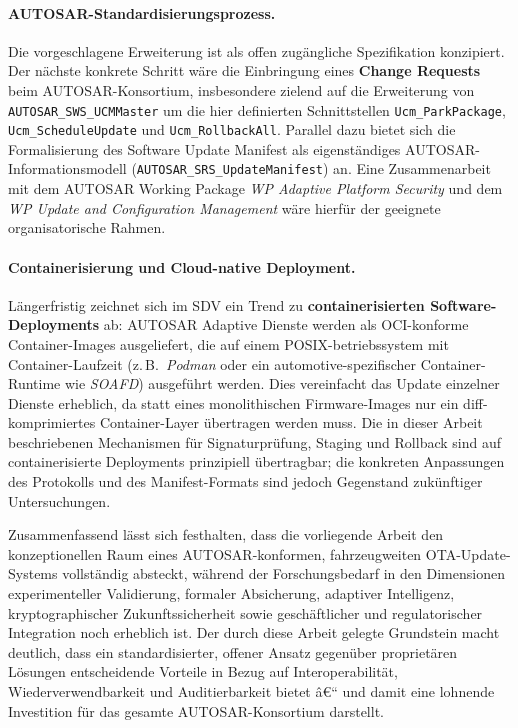 ﻿\documentclass[12pt,a4paper,twoside]{article}
\begin{document}
\paragraph{AUTOSAR-Standardisierungsprozess.}
Die vorgeschlagene Erweiterung ist als offen zugängliche
Spezifikation konzipiert. Der nächste konkrete Schritt wäre
die Einbringung eines \textbf{Change Requests} beim
AUTOSAR-Konsortium, insbesondere zielend auf
die Erweiterung von \texttt{AUTOSAR\_SWS\_UCMMaster} um die hier
definierten Schnittstellen \texttt{Ucm\_ParkPackage},
\texttt{Ucm\_ScheduleUpdate} und \texttt{Ucm\_RollbackAll}.
Parallel dazu bietet sich die Formalisierung des
Software Update Manifest als eigenständiges
AUTOSAR-Informationsmodell (\texttt{AUTOSAR\_SRS\_UpdateManifest})
an. Eine Zusammenarbeit mit dem AUTOSAR Working Package
\textit{WP Adaptive Platform Security} und dem
\textit{WP Update and Configuration Management} wäre hierfür
der geeignete organisatorische Rahmen.

\paragraph{Containerisierung und Cloud-native Deployment.}
Längerfristig zeichnet sich im SDV ein Trend zu
\textbf{containerisierten Software-Deployments} ab: AUTOSAR Adaptive
Dienste werden als OCI-konforme Container-Images ausgeliefert,
die auf einem POSIX-betriebssystem mit Container-Laufzeit
(z.\,B.\ \textit{Podman} oder ein automotive-spezifischer
Container-Runtime wie \textit{SOAFD}) ausgeführt werden.
Dies vereinfacht das Update einzelner Dienste erheblich,
da statt eines monolithischen Firmware-Images nur ein
diff-komprimiertes Container-Layer übertragen werden muss.
Die in dieser Arbeit beschriebenen Mechanismen für
Signaturprüfung, Staging und Rollback sind auf containerisierte
Deployments prinzipiell übertragbar; die konkreten
Anpassungen des Protokolls und des Manifest-Formats
sind jedoch Gegenstand zukünftiger Untersuchungen.

\vspace{0.5em}
Zusammenfassend lässt sich festhalten, dass die vorliegende Arbeit
den konzeptionellen Raum eines AUTOSAR-konformen, fahrzeugweiten
OTA-Update-Systems vollständig absteckt, während der
Forschungsbedarf in den Dimensionen experimenteller
Validierung, formaler Absicherung, adaptiver Intelligenz,
kryptographischer Zukunftssicherheit sowie
geschäftlicher und regulatorischer Integration
noch erheblich ist. Der durch diese Arbeit gelegte Grundstein
macht deutlich, dass ein standardisierter, offener Ansatz
gegenüber proprietären Lösungen entscheidende Vorteile
in Bezug auf Interoperabilität, Wiederverwendbarkeit
und Auditierbarkeit bietet â€“ und damit eine
lohnende Investition für das gesamte
AUTOSAR-Konsortium darstellt.
\end{document}

